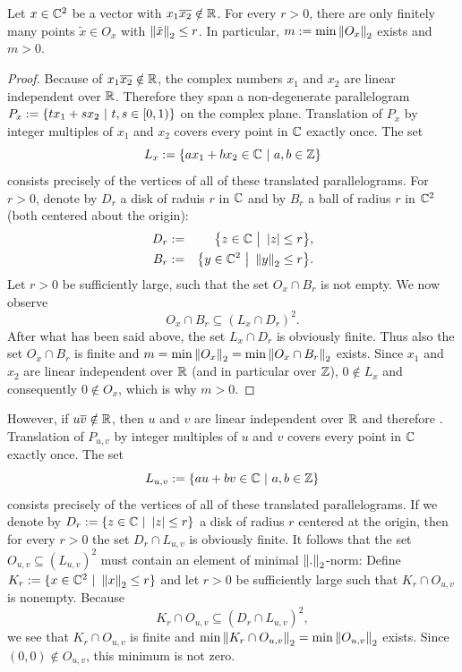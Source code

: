 \begin{lemma}
\label{lem_SL2FunDomMinExists}
Let $x \in \mathbb{C}^2$ be a vector with $x_1 \overline{x_2} \notin \mathbb{R}$. For every $r > 0$, there are only finitely many points $\tilde x \in O_x$ with $\left\| \tilde x \right\|_2 \le r$. In particular, $m := \min{\left\| O_x \right\|_2}$ exists and $m > 0$.
\end{lemma}
\begin{proof}
Because of $x_1 \overline{x_2} \notin \mathbb{R}$, the complex numbers $x_1$ and $x_2$ are linear independent over $\mathbb{R}$. Therefore they span a non-degenerate parallelogram $P_x := \{ t x_1 + s x_2 \ | \ t,s \in [0,1) \}$ on the complex plane. Translation of $P_x$ by integer multiples of $x_1$ and $x_2$ covers every point in $\mathbb{C}$ exactly once. The set
\begin{equation}
\label{eqn_SL2FunDomLx}
L_x := \{ a x_1 + b x_2 \in \mathbb{C} \ | \ a,b \in \mathbb{Z} \}
\end{equation}
consists precisely of the vertices of all of these translated parallelograms. For $r > 0$, denote by $D_r$ a disk of raduis $r$ in $\mathbb{C}$ and by $B_r$ a ball of radius $r$ in $\mathbb{C}^2$ (both centered about the origin):
\begin{eqnarray}
D_r &:=& \big\{ z \in \mathbb{C} \ \big| \ \left|z\right| \le r \big\},\\
B_r &:=& \big\{ y \in \mathbb{C}^2 \ \big| \ \left\| y \right\|_2 \le r \big\}.
\end{eqnarray}
Let $r > 0$ be sufficiently large, such that the set $O_x \cap B_r$ is not empty. We now observe
\begin{equation*}
O_x \cap B_r \subseteq (L_x \cap D_r)^2.
\end{equation*}
After what has been said above, the set $L_x \cap D_r$ is obviously finite. Thus also the set $O_x \cap B_r$ is finite and $m = \min{\left\| O_x \right\|_2} = \min{\left\| O_x \cap B_r \right\|_2}$ exists. Since $x_1$ and $x_2$ are linear independent over $\mathbb{R}$ (and in particular over $\mathbb{Z}$), $0 \notin L_x$ and consequently $0 \notin O_x$, which is why $m > 0$.
\end{proof}

However, if $u \overline{v} \notin \mathbb{R}$, then $u$ and $v$ are linear independent over $\mathbb{R}$ and therefore . Translation of $P_{u,v}$ by integer multiples of $u$ and $v$ covers every point in $\mathbb{C}$ exactly once. The set
\begin{equation*}
L_{u,v} := \{ a u + b v \in \mathbb{C} \ | \ a,b \in \mathbb{Z} \}
\end{equation*}
consists precisely of the vertices of all of these translated parallelograms. If we denote by $D_r := \{ z \in \mathbb{C} \ | \ \left|z\right| \le r \}$ a disk of radius $r$ centered at the origin, then for every $r > 0$ the set $D_r \cap L_{u,v}$ is obviously finite. It follows that the set $O_{u,v} \subseteq (L_{u,v})^2$ must contain an element of minimal $\left\| . \right\|_2$-norm: Define $K_r := \{ x \in \mathbb{C}^2 \ | \ \left\| x \right\|_2 \le r \}$ and let $r > 0$ be sufficiently large such that $K_r \cap O_{u,v}$ is nonempty. Because 
\begin{equation}
\label{eqn_FunDomOuvFinite}
K_r \cap O_{u,v} \subseteq (D_r \cap L_{u,v})^2,
\end{equation}
we see that $K_r \cap O_{u,v}$ is finite and $\min \left\| K_r \cap O_{u,v} \right\|_2 = \min \left\| O_{u,v} \right\|_2$ exists. Since $(0,0) \notin O_{u,v}$, this minimum is not zero.

